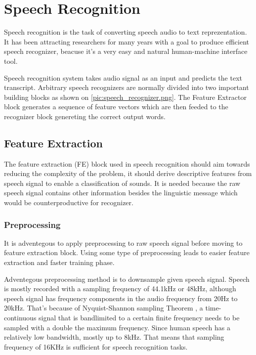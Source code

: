 \chapter{Speech Recognition}

Speech recognition is the task of converting speech audio to text reprezentation.
It has been attracting researchers for many years with a goal to produce efficient speech recognizer, beacuse it's a very easy and natural human-machine interface tool.

Speech recognition system takes audio signal as an input and predicts the text transcript.
Arbitrary speech recognizers are normally divided into two important building blocks as shown on \ref{pic:speech_recognizer.png}.
The Feature Extractor block generates a sequence of feature vectors which are then feeded to the recognizer block genereting the correct output words.


\section{Feature Extraction}

The feature extraction (FE) block used in speech recognition should aim towards reducing the complexity of the problem,
it should derive descriptive features from speech signal to enable a classification of sounds.
It is needed because the raw speech signal contains other information besides the linguistic message which would be counterproductive for recognizer.



\subsection{Preprocessing}

It is adventegous to apply preprocessing to raw speech signal before moving to feature extraction block.
Using some type of preprocessing leads to easier feature extraction and faster training phase.

Adventegous preprocessing method is to downsample given speech signal.
Speech is mostly recorded with a sampling frequency of 44.1kHz or 48kHz, although speech signal has frequency components in the audio frequency from 20Hz to 20kHz\cite{range_speech}.
That's because of Nyquist-Shannon sampling Theorem \cite{shannon}, a time-continuous signal that is bandlimited to a certain finite frequency needs to be sampled with a double the maximum frequency.
Since human speech has a relatively low bandwidth, mostly up to 8kHz.
That means that sampling frequency of 16KHz is sufficient for speech recognition tasks\cite{speech_preprocessing}.

